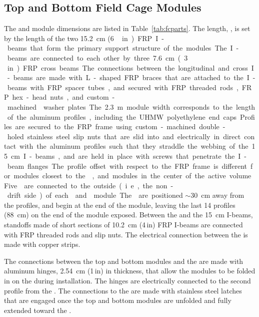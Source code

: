 \subsection{Top and Bottom Field Cage Modules}

The  and  module dimensions are listed in Table~\ref{tab:fcparts}. The length, \spfcmodlen{}, is set by the length of the two \SI{15.2}{\cm} (\SI{6}\,in) FRP I-beams that form the primary support structure of the modules. The I-beams are connected to each other by three  \SI{7.6}{\cm} (\SI{3}\,in) FRP cross beams. The connections between the longitudinal and cross I-beams are made with L-shaped FRP braces that are attached to the I-beams with FRP spacer tubes, and secured with FRP threaded rods, FRP hex-head nuts, and custom-machined \frfour washer plates.

The \SI{2.3}{\m} module width corresponds to the length of the aluminum profiles, including the UHMW polyethylene end caps. Profiles are secured to the FRP frame using custom-machined double-holed stainless steel slip nuts that are slid into and electrically in direct contact with the aluminum profiles such that they straddle the webbing of the \SI{15}{\cm} I-beams, and are held in place with screws that penetrate the I-beam flanges. The profile offset with respect to the FRP frame is different for modules closest to the , %
and modules in the center of the active volume.

Five  are connected to the outside (i.e., the non-drift side) of each  and  module. The  are positioned $\sim$\SI{30}{\cm} away from the profiles, and begin at the  end of the module, leaving the last 14 profiles (\SI{88}{\cm}) on the  end of the module exposed. Between the  and the \SI{15}{\cm} I-beams, standoffs made of short sections of \SI{10.2}{\cm} (4\,in)  FRP I-beams are connected with FRP threaded rods and slip nuts. The electrical connection between the  is made with copper strips.

The connections between the top and bottom modules and the  are made with aluminum hinges, \SI{2.54}{\cm} (1\,in) in thickness, that allow the modules to be folded in on the  during installation. The hinges are electrically connected to the second profile from the . The connections to the  are made with stainless steel latches that are engaged once the top and bottom  modules are unfolded and fully extended toward the .


